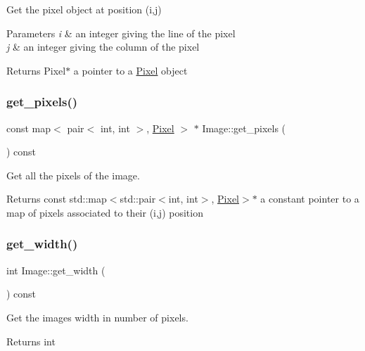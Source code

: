 Get the pixel object at position (i,j) 


\begin{DoxyParams}{Parameters}
{\em i} & an integer giving the line of the pixel \\
\hline
{\em j} & an integer giving the column of the pixel \\
\hline
\end{DoxyParams}
\begin{DoxyReturn}{Returns}
Pixel$\ast$ a pointer to a \hyperlink{classPixel}{Pixel} object 
\end{DoxyReturn}
\mbox{\label{classImage_af1a715bc9351b3385bd0591dfe3ce464}} 
\subsubsection{\texorpdfstring{get\+\_\+pixels()}{get\_pixels()}}
{\footnotesize\ttfamily const map$<$ pair$<$ int, int $>$, \hyperlink{classPixel}{Pixel} $>$ $\ast$ Image\+::get\+\_\+pixels (\begin{DoxyParamCaption}{ }\end{DoxyParamCaption}) const}



Get all the pixels of the image. 

\begin{DoxyReturn}{Returns}
const std\+::map$<$std\+::pair$<$int, int$>$, \hyperlink{classPixel}{Pixel}$>$$\ast$ a constant pointer to a map of pixels associated to their (i,j) position 
\end{DoxyReturn}
\mbox{\label{classImage_a1642b1ab6e1c8d15c78a59557642c20f}} 
\subsubsection{\texorpdfstring{get\+\_\+width()}{get\_width()}}
{\footnotesize\ttfamily int Image\+::get\+\_\+width (\begin{DoxyParamCaption}{ }\end{DoxyParamCaption}) const}



Get the image\textquotesingle{}s width in number of pixels. 

\begin{DoxyReturn}{Returns}
int 
\end{DoxyReturn}
\mbox{\label{classImage_a0d6de27cb2fbdf03bcdd68c92f8dbf6a}} 

